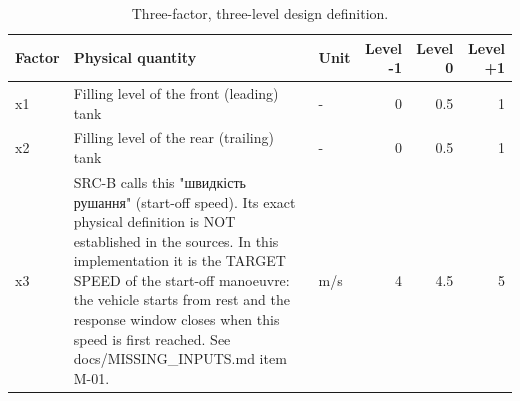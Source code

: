 \begin{table}
\caption{Three-factor, three-level design definition.}
\label{tab:table02_factors}
\begin{tabular}{lllrrr}
\toprule
Factor & Physical quantity & Unit & Level -1 & Level 0 & Level +1 \\
\midrule
x1 & Filling level of the front (leading) tank & - & 0 & 0.5 & 1 \\
x2 & Filling level of the rear (trailing) tank & - & 0 & 0.5 & 1 \\
x3 & SRC-B calls this "швидкість рушання" (start-off speed). Its exact physical definition is NOT established in the sources. In this implementation it is the TARGET SPEED of the start-off manoeuvre: the vehicle starts from rest and the response window closes when this speed is first reached. See docs/MISSING\_INPUTS.md item M-01. & m/s & 4 & 4.5 & 5 \\
\bottomrule
\end{tabular}
\end{table}
